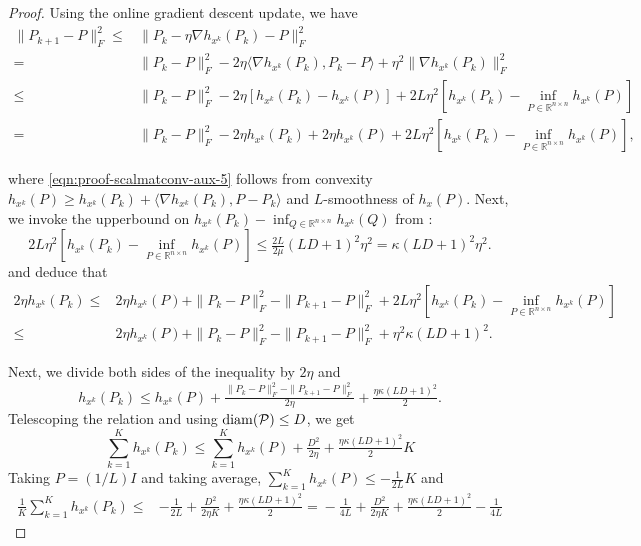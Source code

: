 \begin{proof}
	Using the online gradient descent
update, we have
\begin{align}
  \| P_{k + 1} - P \|_F^2 \leq{} & \| P_k - \eta \nabla h_{x^k} (P_k) - P \|_F^2
  \nonumber\\
  ={} & \| P_k - P \|_F^2 - 2 \eta \langle \nabla h_{x^k} (P_k), P_k - P \rangle
  + \eta^2 \| \nabla h_{x^k} (P_k) \|_F^2 \nonumber\\
  \leq{} & \| P_k - P \|_F^2 - 2 \eta [h_{x^k} (P_k) - h_{x^k} (P)] + 2 L \eta^2
  [h_{x^k} (P_k) - \inf_{P \in \mathbb{R}^{n \times n}} h_{x^k} (P)]
  \label{eqn:proof-scalmatconv-aux-5}
 \\
  ={} & \| P_k - P \|_F^2 - 2 \eta h_{x^k} (P_k) + 2 \eta h_{x^k} (P) + 2 L
  \eta^2 [h_{x^k} (P_k) - \inf_{P \in \mathbb{R}^{n \times n}} h_{x^k} (P)],
  \nonumber
\end{align}

where \eqref{eqn:proof-scalmatconv-aux-5} follows from convexity $h_{x^k} (P) \geq h_{x^k}
(P_k) + \langle \nabla h_{x^k} (P_k), P - P_k \rangle$ and $L$-smoothness of
$h_x (P)$. Next, we invoke the upperbound on $h_{x^k} (P_k) - \inf_{Q \in
\mathbb{R}^{n \times n}} h_{x^k} (Q)$ from :
\[ {2 L \eta^2 [h_{x^k} (P_k) - \inf_{P \in \mathbb{R}^{n \times
   n}} h_{x^k} (P)]} \leq \tfrac{2 L}{2 \mu} (L D + 1)^2 \eta^2 = \kappa (L D
   + 1)^2 \eta^2 . \]
and deduce that
\begin{align}
  2 \eta h_{x^k} (P_k) \leq{} & 2 \eta h_{x^k} (P) + \| P_k - P \|_F^2 - \| P_{k
  + 1} - P \|_F^2 + {2 L \eta^2 [h_{x^k} (P_k) - \inf_{P \in
  \mathbb{R}^{n \times n}} h_{x^k} (P)]} \nonumber\\
  \leq{} & 2 \eta h_{x^k} (P) + \| P_k - P \|_F^2 - \| P_{k + 1} - P \|_F^2 +
  \eta^2 \kappa (L D + 1)^2 . \nonumber
\end{align}

Next, we divide both sides of the inequality by $2 \eta$ and
\[ h_{x^k} (P_k) \leq h_{x^k} (P) + \tfrac{\| P_k - P \|_F^2 - \| P_{k + 1} -
   P \|_F^2}{2 \eta} + \tfrac{\eta \kappa (L D + 1)^2}{2} . \]
Telescoping the relation and using $\operatorname{diam} (\mathcal{P}) \leq D$, we get
\[\textstyle \sum_{k = 1}^K h_{x^k} (P_k) \leq \sum_{k = 1}^K h_{x^k} (P) +
   \tfrac{D^2}{2 \eta} + \tfrac{\eta \kappa (L D + 1)^2}{2} K \]
Taking $P = (1 / L) I$ and taking average, $\sum_{k = 1}^K h_{x^k} (P) \leq
{- \tfrac{1}{2 L}} K$ and
\begin{align}
\textstyle  \tfrac{1}{K} \sum_{k = 1}^K h_{x^k} (P_k) \leq{} & {-
  \tfrac{1}{2 L}} + \tfrac{D^2}{2 \eta K} + \tfrac{\eta \kappa (L D + 1)^2}{2}
    ={} - \tfrac{1}{4 L} + \tfrac{D^2}{2 \eta K} + \tfrac{\eta \kappa (L D +
  1)^2}{2} - \tfrac{1}{4 L} \nonumber
\end{align}


\end{proof}
